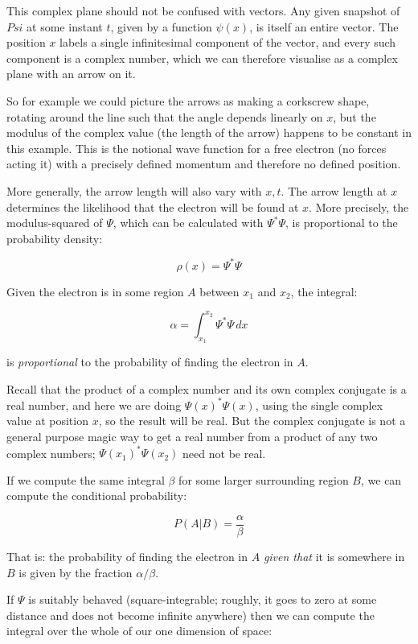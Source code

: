 This complex plane should not be confused with vectors. Any given snapshot of $Psi$ at some instant $t$, given by a function $\psi(x)$, is itself an entire vector. The position $x$ labels a single infinitesimal component of the vector, and every such component is a complex number, which we can therefore visualise as a complex plane with an arrow on it.

So for example we could picture the arrows as making a corkscrew shape, rotating around the line such that the angle depends linearly on $x$, but the modulus of the complex value (the length of the arrow) happens to be constant in this example. This is the notional wave function for a free electron (no forces acting it) with a precisely defined momentum and therefore no defined position.

More generally, the arrow length will also vary with $x, t$. The arrow length at $x$ determines the likelihood that the electron will be found at $x$. More precisely, the modulus-squared of $\Psi$, which can be calculated with $\Psi^*\Psi$, is proportional to the probability density:

$$\rho(x) = \Psi^*\Psi$$

Given the electron is in some region $A$ between $x_1$ and $x_2$, the integral:

$$
\alpha =
\int_{x_1}^{x_2}
\Psi^*\Psi
\,dx
$$

is \textit{proportional} to the probability of finding the electron in $A$.

Recall that the product of a complex number and its own complex conjugate is a real number, and here we are doing $\Psi(x)^*\Psi(x)$, using the single complex value at position $x$, so the result will be real. But the complex conjugate is not a general purpose magic way to get a real number from a product of any two complex numbers; $\Psi(x_1)^*\Psi(x_2)$ need not be real.

If we compute the same integral $\beta$ for some larger surrounding region $B$, we can compute the conditional probability:

$$
P(A|B) = \frac{\alpha}{\beta}
$$

That is: the probability of finding the electron in $A$ \textit{given that} it is somewhere in $B$ is given by the fraction $\alpha / \beta$.

If $\Psi$ is suitably behaved (square-integrable; roughly, it goes to zero at some distance and does not become infinite anywhere) then we can compute the integral over the whole of our one dimension of space:

